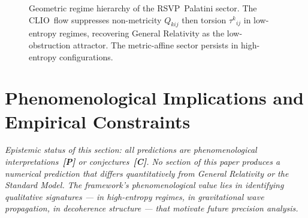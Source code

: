 \documentclass[12pt,a4paper]{article}
\newcommand{\RSVP}{\textrm{RSVP}}
\newcommand{\CLIO}{\textrm{CLIO}}
\begin{document}
\begin{figure}[ht]
\centering
{}
\caption{Geometric regime hierarchy of the \RSVP\ Palatini sector. The \CLIO\
flow suppresses non-metricity $Q_{kij}$ then torsion $\tau^k{}_{ij}$ in
low-entropy regimes, recovering General Relativity as the low-obstruction
attractor. The metric-affine sector persists in high-entropy configurations.}
\label{fig:geom-hierarchy}
\end{figure}

\section{Phenomenological Implications and Empirical Constraints}

\emph{Epistemic status of this section: all predictions are phenomenological
interpretations~\textbf{[P]} or conjectures~\textbf{[C]}. No section of this
paper produces a numerical prediction that differs quantitatively from General
Relativity or the Standard Model. The framework's phenomenological value lies
in identifying qualitative signatures --- in high-entropy regimes, in
gravitational wave propagation, in decoherence structure --- that motivate
future precision analysis.}
\end{document}
